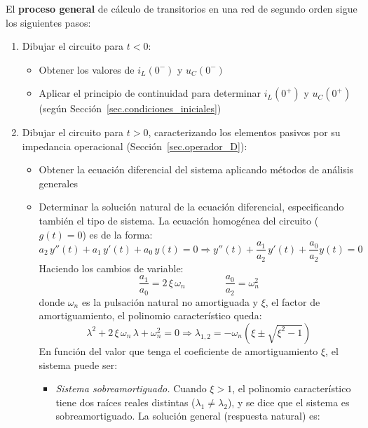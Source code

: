El \textbf{proceso general} de cálculo de transitorios en una red de
segundo orden sigue los siguientes pasos:
\begin{enumerate}
\item Dibujar el circuito para $t < 0$:
  \begin{itemize}
  \item Obtener los valores de $i_L(0^-)$ y $u_C(0^-)$
  \item Aplicar el principio de continuidad para determinar $i_L(0^+)$
    y $u_C(0^+)$ (según Sección~\ref{sec.condiciones_iniciales})
  \end{itemize}
\item Dibujar el circuito para \(t > 0\), caracterizando los elementos
  pasivos por su impedancia operacional
  (Sección~\ref{sec.operador_D}):
  \begin{itemize}
  \item Obtener la ecuación diferencial del sistema aplicando métodos
    de análisis generales
  \item Determinar la solución natural de la ecuación diferencial,
    especificando también el tipo de sistema. La ecuación homogénea
    del circuito ($g(t)=0$) es de la forma:
    \begin{equation*}
      a_2\,y''(t)+a_1\,y'(t)+a_0\,y(t)=0\Rightarrow {y''(t)+\dfrac{a_1}{a_2}\,y'(t)+\dfrac{a_0}{a_2}y(t)=0}
    \end{equation*}
    Haciendo los cambios de variable:
    \begin{equation}\label{eq.xi-omega_n}
      {\dfrac{a_1}{a_0}=2\,\xi\,\omega_n}\qquad \qquad
      {\dfrac{a_0}{a_2}=\omega_n^2}
    \end{equation}
    donde $\omega_n$ es la pulsación natural no amortiguada y $\xi$,
    el factor de amortiguamiento, el polinomio característico queda:
    \begin{equation*}
      \lambda^2+2\,\xi\,\omega_n\,\lambda + \omega_n^2=0 \Rightarrow \lambda_{1,2}=-\omega_n\left(\xi\pm\sqrt{\xi^2-1} \right)
    \end{equation*}
    En función del valor que tenga el coeficiente de amortiguamiento
    $\xi$, el sistema puede ser:
    \begin{itemize}
    \item \textit{Sistema sobreamortiguado.} Cuando $\xi>1$, el
      polinomio característico tiene {dos raíces reales distintas}
      ($\lambda_1\neq\lambda_2$), y se dice que el sistema es
      {sobreamortiguado}. La solución general (respuesta natural) es:
      \begin{equation*}

\end{equation*}
\end{itemize}
\end{itemize}
\end{enumerate}
